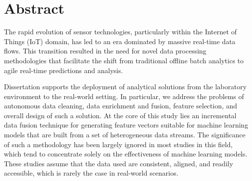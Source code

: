 % 
\chapter*{Abstract}

The rapid evolution of sensor technologies, particularly within the Internet of Things (IoT) domain, has led to an era dominated by massive real-time data flows. 
This transition resulted in the need for novel data processing methodologies that facilitate the shift from traditional offline batch analytics to agile real-time predictions and analysis.

Dissertation supports the deployment of analytical solutions from the laboratory environment to the real-world setting.
In particular, we address the problems of autonomous data cleaning, data enrichment and fusion, feature selection, and overall design of such a solution.
At the core of this study lies an incremental data fusion technique for generating feature vectors suitable for machine learning models that are built from a set of heterogeneous data streams.
The significance of such a methodology has been largely ignored in most studies in this field, which tend to concentrate solely on the effectiveness of machine learning models.
These studies assume that the data used are consistent, aligned, and readily accessible, which is rarely the case in real-world scenarios.

